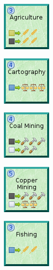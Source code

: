 \documentclass{article}
\begin{document}
\begin{figure}[h]
  \begin{subfigure}{}
    \includegraphics[scale=1]{../rules/png/doe_tech_agriculture.png}
  \end{subfigure}
  \begin{subfigure}{}
    \includegraphics[scale=1]{../rules/png/doe_tech_cartography.png}
  \end{subfigure}
  \begin{subfigure}{}
    \includegraphics[scale=1]{../rules/png/doe_tech_coal_mining.png}
  \end{subfigure}
  \begin{subfigure}{}
    \includegraphics[scale=1]{../rules/png/doe_tech_copper_mining.png}
  \end{subfigure}
  \begin{subfigure}{}
    \includegraphics[scale=1]{../rules/png/doe_tech_fishing.png}
  \end{subfigure}
\end{figure}
\end{document}
